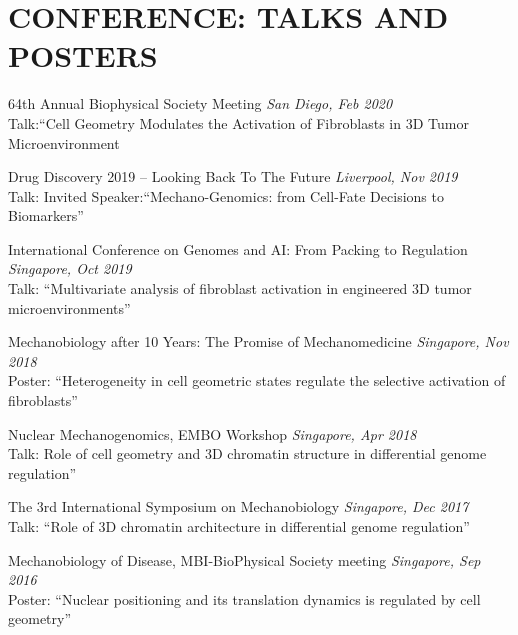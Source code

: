 \documentclass[letterpaper,11pt]{article}
\begin{document}
\section{\bf CONFERENCE: TALKS AND POSTERS}
\begin{etaremune}[itemsep=0pt,parsep=0pt]
    \item 64th Annual Biophysical Society Meeting    \hfill {\emph {San Diego, Feb 2020}}\\
        \hspace*{3ex}Talk:“Cell Geometry Modulates the Activation of Fibroblasts in 3D Tumor Microenvironment
     \item Drug Discovery 2019 – Looking Back To The Future  \hfill {\emph {Liverpool, Nov 2019}}\\
        \hspace*{3ex}Talk: Invited Speaker:“Mechano-Genomics: from Cell-Fate Decisions to Biomarkers”
    \item International Conference on Genomes and AI: From Packing to Regulation  \hfill {\emph {Singapore, Oct 2019}}\\
        \hspace*{3ex}Talk: “Multivariate analysis of fibroblast activation in engineered 3D tumor microenvironments”
    \item Mechanobiology after 10 Years: The Promise of Mechanomedicine \hfill {\emph {Singapore, Nov 2018}}\\
        \hspace*{3ex}Poster: “Heterogeneity in cell geometric states regulate the selective activation of fibroblasts”
    \item Nuclear Mechanogenomics, EMBO Workshop \hfill {\emph {Singapore, Apr 2018}}\\
        \hspace*{3ex}Talk: Role of cell geometry and 3D chromatin structure in differential genome regulation”
    \item The 3rd International Symposium on Mechanobiology  \hfill {\emph {Singapore, Dec 2017}}\\
        \hspace*{3ex}Talk: “Role of 3D chromatin architecture in differential genome regulation”
     \item Mechanobiology of Disease, MBI-BioPhysical Society meeting \hfill {\emph {Singapore, Sep 2016}}\\
        \hspace*{3ex}Poster: “Nuclear positioning and its translation dynamics is regulated by cell geometry”
\end{etaremune}
\end{document}
